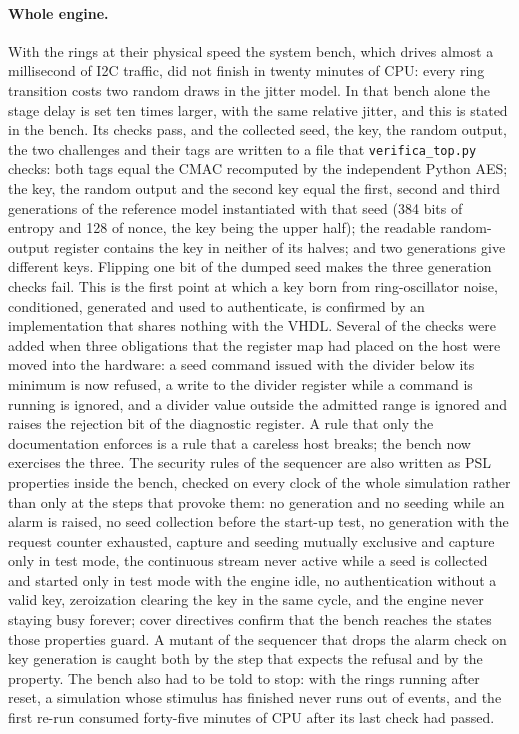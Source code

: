 \paragraph{Whole engine.} With the rings at their physical speed the
system bench, which drives almost a millisecond of I2C traffic, did not
finish in twenty minutes of CPU: every ring transition costs two random
draws in the jitter model. In that bench alone the stage delay is set ten
times larger, with the same relative jitter, and this is stated in the
bench. Its checks pass, and the collected seed, the key, the random
output, the two challenges and their tags are written to a file that
\texttt{verifica\_top.py} checks: both tags equal the CMAC recomputed by
the independent Python AES; the key, the random output and the second
key equal the first, second and third generations of the reference
model instantiated with that seed (384 bits of entropy and 128 of
nonce, the key being the upper half); the readable random-output
register contains the key in neither of its halves; and two generations
give different keys. Flipping one bit of the dumped seed makes the three
generation checks fail. This is the first point at which a key born from
ring-oscillator noise, conditioned, generated and used to authenticate,
is confirmed by an implementation that shares nothing with the VHDL.
Several of the checks were added when three obligations that the
register map had placed on the host were moved into the hardware: a seed
command issued with the divider below its minimum is now refused, a
write to the divider register while a command is running is ignored, and
a divider value outside the admitted range is ignored and raises the
rejection bit of the diagnostic register. A
rule that only the documentation enforces is a rule that a careless host
breaks; the bench now exercises the three. The security rules of the
sequencer are also written as PSL properties inside the bench, checked
on every clock of the whole simulation rather than only at the steps
that provoke them: no generation and no seeding while an alarm is
raised, no seed collection before the start-up test, no generation with
the request counter exhausted, capture and seeding mutually exclusive
and capture only in test mode, the continuous stream never active while
a seed is collected and started only in test mode with the engine idle,
no authentication without a valid key, zeroization clearing the key in
the same cycle, and the engine never staying busy forever; cover
directives confirm that the bench
reaches the states those properties guard. A mutant of the sequencer
that drops the alarm check on key generation is caught both by the step
that expects the refusal and by the property. The bench also had to be
told to stop: with the rings running after reset, a simulation whose stimulus has
finished never runs out of events, and the first re-run consumed
forty-five minutes of CPU after its last check had passed.

